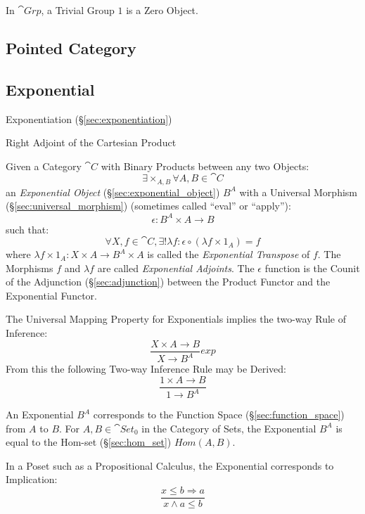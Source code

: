 In $\cat{Grp}$, a Trivial Group ${1}$ is a Zero Object.



\subsection{Pointed Category}\label{sec:pointed_category}



\subsection{Exponential}\label{sec:category_exponential}

\fist Exponentiation (\S\ref{sec:exponentiation})

Right Adjoint of the Cartesian Product

Given a Category $\cat{C}$ with Binary Products between any two
Objects:
\[
  \exists \times_{A,B} \forall A,B \in \cat{C}
\]
an \emph{Exponential Object} (\S\ref{sec:exponential_object}) $B^A$
with a Universal Morphism (\S\ref{sec:universal_morphism}) (sometimes
called ``eval'' or ``apply''):
\[
  \epsilon : B^A \times A \rightarrow B
\]
such that:
\[
  \forall X, f \in \cat{C}, \exists ! \lambda f :
  \epsilon \circ (\lambda f \times 1_A) = f
\]
where $\lambda f \times 1_A : X \times A \rightarrow B^A \times A$ is
called the \emph{Exponential Transpose} of $f$. The Morphisms $f$ and
$\lambda f$ are called \emph{Exponential Adjoints}. The $\epsilon$
function is the Counit of the Adjunction (\S\ref{sec:adjunction}) between
the Product Functor and the Exponential Functor.

The Universal Mapping Property for Exponentials implies the two-way
Rule of Inference:
\[
  {
    \frac{X \times A \rightarrow B}
    {X \rightarrow B^A}
  }exp
\]
From this the following Two-way Inference Rule may be Derived:
\[
    \frac{1 \times A \rightarrow B}
    {1 \rightarrow B^A}
\]

An Exponential $B^A$ corresponds to the Function Space
(\S\ref{sec:function_space}) from $A$ to $B$. For $A,B \in
\cat{Set}_0$ in the Category of Sets, the Exponential $B^A$ is
equal to the Hom-set (\S\ref{sec:hom_set}) $Hom(A,B)$.

In a Poset such as a Propositional Calculus, the Exponential
corresponds to Implication:
\[
    \frac{x \leq b \Rightarrow a}
    {x \wedge a \leq b}
\]

